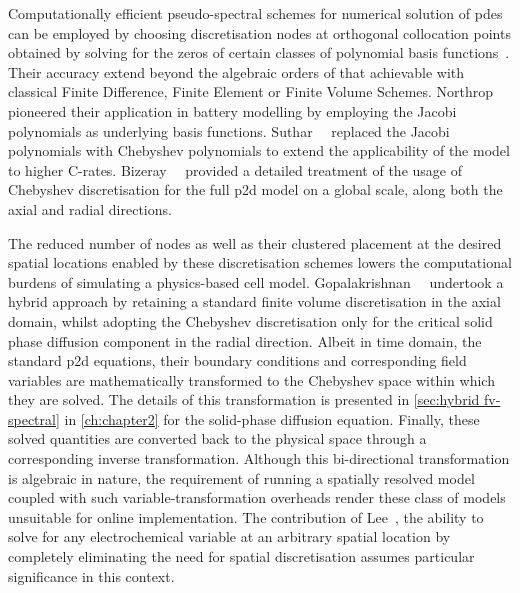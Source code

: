 Computationally    efficient     pseudo-spectral    schemes     for    numerical
solution   of   \glspl{pde}   can be employed    by   choosing   discretisation
nodes    at    orthogonal    collocation     points    obtained    by    solving
for     the    zeros     of    certain     classes    of     polynomial    basis
functions~\cite{Ferguson1971,Trefethen2000,Boyd2001,Shizgal2015,Dutykh2016}.
Their accuracy extend beyond  the  algebraic  orders of that achievable with
classical  Finite  Difference,  Finite Element  or Finite Volume Schemes.
Northrop~\etal{}~\cite{Northrop2011} pioneered their application in battery
modelling by employing the Jacobi polynomials as underlying basis functions.
Suthar~\etal{}~\cite{Suthar2014} replaced the Jacobi polynomials with Chebyshev
polynomials to extend the applicability of the model to higher C-rates.
Bizeray~\etal{}~\cite{Bizeray2015}    provided   a detailed treatment of the
usage of Chebyshev discretisation  for   the  full   \gls{p2d} model   on  a
global  scale,  \ie{}  along  both   the  axial  and  radial directions.


The  reduced  number of  nodes  as  well as  their  clustered  placement at  the
desired  spatial  locations  enabled  by  these  discretisation  schemes  lowers
the   computational  burdens   of   simulating  a   physics-based  cell   model.
Gopalakrishnan~\etal{}~\cite{Gopalakrishnan2018} undertook a  hybrid approach by
retaining a  standard finite volume  discretisation in the axial  domain, whilst
adopting  the  Chebyshev  discretisation  only  for  the  critical  solid  phase
diffusion component in the radial direction. Albeit in time domain, the standard
\gls{p2d} equations, their boundary conditions and corresponding field variables
are  mathematically transformed  to the  Chebyshev space  within which  they are
solved.  The details  of this  transformation is  presented in  \cref{sec:hybrid
fv-spectral}  in  \cref{ch:chapter2}  for the  solid-phase  diffusion  equation.
Finally,  these solved  quantities  are  converted back  to  the physical  space
through  a corresponding  inverse transformation.  Although this  bi-directional
transformation is  algebraic in nature,  the requirement of running  a spatially
resolved model coupled with  such variable-transformation overheads render these
class  of  models unsuitable  for  online  implementation. The  contribution  of
Lee~\etal{}, \ie{} the  ability to solve for any electrochemical  variable at an
arbitrary  spatial  location by  completely  eliminating  the need  for  spatial
discretisation assumes particular significance in this context.


